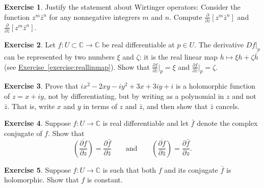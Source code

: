 \documentclass[12pt,openany]{book}
\newcommand{\C}{{\mathbb{C}}}
\theoremstyle{plain}
\theoremstyle{remark}
\theoremstyle{definition}
\newenvironment{exbox}{%
    \def\FrameCommand{\vrule width 1pt \relax\hspace{10pt}}%
    \MakeFramed{\advance\hsize-\width\FrameRestore}%
}{%
    \endMakeFramed
}
\theoremstyle{exercise}
\newtheorem{exercise}{Exercise}[section]
\theoremstyle{example}
\newcommand{\exerciseref}[1]{\hyperref[#1]{Exercise~\ref*{#1}}}
\begin{document}
\begin{exbox}
\begin{exercise}
Justify the statement about Wirtinger operators:  Consider
the function $z^m\bar{z}^n$ for any nonnegative integrers $m$ and $n$.
Compute
$\frac{\partial}{\partial z} \left[ z^m\bar{z}^n \right]$
and
$\frac{\partial}{\partial \bar{z}} \left[ z^m\bar{z}^n \right]$.
\end{exercise}

\begin{exercise}
Let $f \colon U \subset \C \to \C$ be real differentiable at $p \in U$.
The derivative $Df|_{p}$ can be represented by two numbers $\xi$ and
$\zeta$: it is the real linear map $h \mapsto \xi h + \zeta \bar{h}$
(see \exerciseref{exercise:reallinmap}).
Show that $\frac{\partial f}{\partial z} \big|_p = \xi$ and
$\frac{\partial f}{\partial \bar{z}} \big|_p = \zeta$.
\end{exercise}

\begin{exercise}
Prove that $ix^2 - 2xy -iy^2 + 3x + 3iy + i$ is a holomorphic function of
$z = x+iy$, not by
differentiating, but by writing as a polynomial in $z$ and not $\bar{z}$.
That is, write $x$ and $y$ in terms of $z$ and $\bar{z}$, and then show
that $\bar{z}$ cancels.
\end{exercise}

\begin{exercise} \label{exercise:wirtingerandbar}
Suppose $f \colon U \to \C$ is real differentiable and let $\bar{f}$
denote the complex conjugate of $f$.  Show that
\begin{equation*}
\overline{\left(\frac{\partial f}{\partial z}\right)} = 
\frac{\partial \bar{f}}{\partial \bar{z}}
\qquad \text{and} \qquad
\overline{\left(\frac{\partial f}{\partial \bar{z}}\right)} = 
\frac{\partial \bar{f}}{\partial z} .
\end{equation*}
\end{exercise}

\begin{exercise}
Suppose $f \colon U \to \C$ is such that both $f$ and its conjugate
$\bar{f}$ is holomorphic.  Show that $f$ is constant.
\end{exercise}


\end{exbox}
\end{document}
